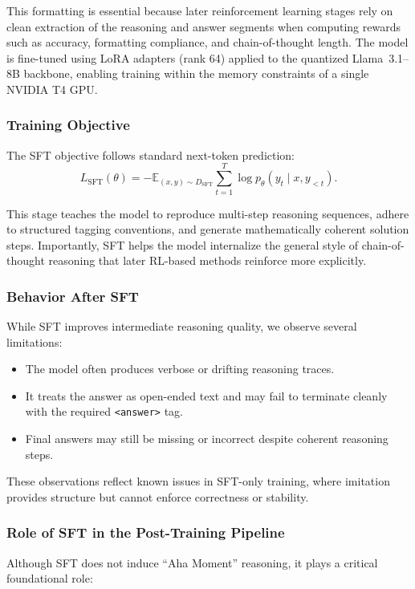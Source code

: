 \documentclass{article}
\begin{document}
This formatting is essential because later reinforcement learning stages rely on clean extraction of the reasoning and answer segments when computing rewards such as accuracy, formatting compliance, and chain-of-thought length. The model is fine-tuned using LoRA adapters (rank 64) applied to the quantized Llama~3.1--8B backbone, enabling training within the memory constraints of a single NVIDIA T4 GPU.

\subsubsection*{Training Objective}

The SFT objective follows standard next-token prediction:
\[
L_{\text{SFT}}(\theta) =
-\mathbb{E}_{(x,y) \sim D_{\mathrm{SFT}}}
\sum_{t=1}^{T} \log p_\theta(y_t \mid x, y_{<t}).
\]

This stage teaches the model to reproduce multi-step reasoning sequences, adhere to structured tagging conventions, and generate mathematically coherent solution steps. Importantly, SFT helps the model internalize the general style of chain-of-thought reasoning that later RL-based methods reinforce more explicitly.

\subsubsection*{Behavior After SFT}

While SFT improves intermediate reasoning quality, we observe several limitations:
\begin{itemize}
    \item The model often produces verbose or drifting reasoning traces.
    \item It treats the answer as open-ended text and may fail to terminate cleanly with the required \texttt{<answer>} tag.
    \item Final answers may still be missing or incorrect despite coherent reasoning steps.
\end{itemize}

These observations reflect known issues in SFT-only training, where imitation provides structure but cannot enforce correctness or stability.

\subsubsection*{Role of SFT in the Post-Training Pipeline}

Although SFT does not induce ``Aha Moment'' reasoning, it plays a critical foundational role:
\end{document}

